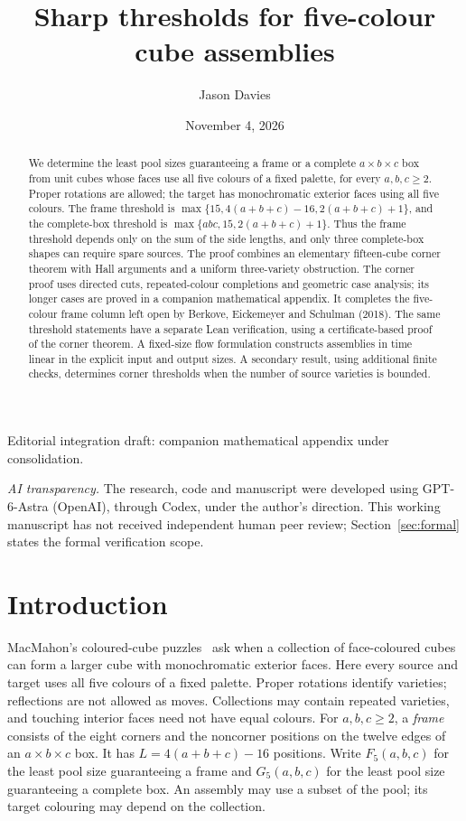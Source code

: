 \documentclass[11pt]{article}
\title{Sharp thresholds for five-colour cube assemblies}
\author{Jason Davies}
\date{November 4, 2026}
\theoremstyle{remark}
\begin{document}
\maketitle
\begin{center}\small Editorial integration draft: companion mathematical appendix under consolidation.\end{center}
\begin{abstract}
We determine the least pool sizes guaranteeing a frame or a complete
$a\times b\times c$ box from unit cubes whose faces use all five colours
of a fixed palette, for every $a,b,c\ge2$. Proper rotations are allowed;
the target has monochromatic exterior faces using all five colours.
The frame threshold is $\max\{15,4(a+b+c)-16,2(a+b+c)+1\}$, and the
complete-box threshold is $\max\{abc,15,2(a+b+c)+1\}$.
Thus the frame threshold depends only on the sum of the side lengths,
and only three complete-box shapes can require spare sources.
The proof combines an elementary fifteen-cube corner theorem with Hall
arguments and a uniform three-variety obstruction. The corner proof uses
directed cuts, repeated-colour completions and geometric case analysis;
its longer cases are proved in a companion mathematical appendix. It completes the
five-colour frame column left open by Berkove, Eickemeyer and Schulman
(2018). The same threshold statements have a separate Lean verification, using
a certificate-based proof of the corner theorem. A fixed-size flow
formulation constructs assemblies in time linear in the explicit input
and output sizes. A secondary result, using additional finite checks, determines corner
thresholds when the number of source varieties is bounded.
\end{abstract}
\noindent\small\textit{AI transparency.} The research, code and manuscript were
developed using GPT-6-Astra (OpenAI), through Codex, under the author's
direction. This working manuscript has not received independent human peer
review; Section~\ref{sec:formal} states the formal verification scope.
\normalsize

\section{Introduction}
MacMahon's coloured-cube puzzles~\cite{MacMahon} ask when a collection of
face-coloured cubes can form a larger cube with monochromatic exterior
faces. Here every source and target uses all five colours of a fixed
palette. Proper rotations identify varieties; reflections are not allowed
as moves. Collections may contain repeated varieties, and touching interior
faces need not have equal colours.
For $a,b,c\ge2$, a \emph{frame} consists of the eight corners and the
noncorner positions on the twelve edges of an $a\times b\times c$ box.
It has $L=4(a+b+c)-16$ positions. Write $F_5(a,b,c)$ for the least pool
size guaranteeing a frame and $G_5(a,b,c)$ for the least pool size
guaranteeing a complete box. An assembly may use a subset of the pool;
its target colouring may depend on the collection.
\end{document}
